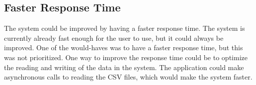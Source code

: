 \subsection{Faster Response Time}\label{subsec:faster-response-time}

The system could be improved by having a faster response time.
The system is currently already fast enough for the user to use, but it could always be improved.
One of the would-haves was to have a faster response time, but this was not prioritized.
One way to improve the response time could be to optimize the reading and writing of the data in the system.
The application could make asynchronous calls to reading the CSV files, which would make the system faster.
